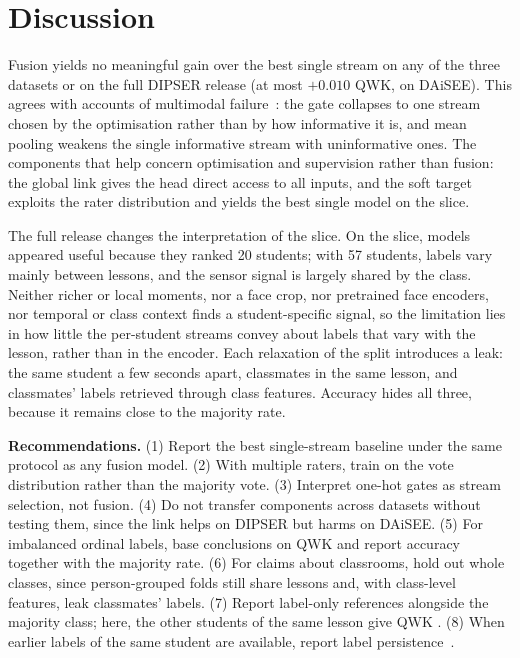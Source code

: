 \section{Discussion}
\label{sec:discussion}

Fusion yields no meaningful gain over the best single stream on any of the three datasets or on the full DIPSER release (at most $+0.010$ QWK, on DAiSEE). This agrees with accounts of multimodal failure~\cite{wang2020makes,peng2022balanced}: the gate collapses to one stream chosen by the optimisation rather than by how informative it is, and mean pooling weakens the single informative stream with uninformative ones. The components that help concern optimisation and supervision rather than fusion: the global link gives the head direct access to all inputs, and the soft target exploits the rater distribution and yields the best single model on the slice.

The full release changes the interpretation of the slice. On the slice, models appeared useful because they ranked 20 students; with 57 students, labels vary mainly between lessons, and the sensor signal is largely shared by the class. Neither richer or local moments, nor a face crop, nor pretrained face encoders, nor temporal or class context finds a student-specific signal, so the limitation lies in how little the per-student streams convey about labels that vary with the lesson, rather than in the encoder.  Each relaxation of the split introduces a leak: the same student a few seconds apart, classmates in the same lesson, and classmates' labels retrieved through class features. Accuracy hides all three, because it remains close to the majority rate.

\textbf{Recommendations.} (1) Report the best single-stream baseline under the same protocol as any fusion model. (2) With multiple raters, train on the vote distribution rather than the majority vote. (3) Interpret one-hot gates as stream selection, not fusion. (4) Do not transfer components across datasets without testing them, since the link helps on DIPSER but harms on DAiSEE. (5) For imbalanced ordinal labels, base conclusions on QWK and report accuracy together with the majority rate. (6) For claims about classrooms, hold out whole classes, since person-grouped folds still share lessons and, with class-level features, leak classmates' labels. (7) Report label-only references alongside the majority class; here, the other students of the same lesson give QWK \fcExpPrior. (8) When earlier labels of the same student are available, report label persistence~\cite{demasi2017meaningless}.

